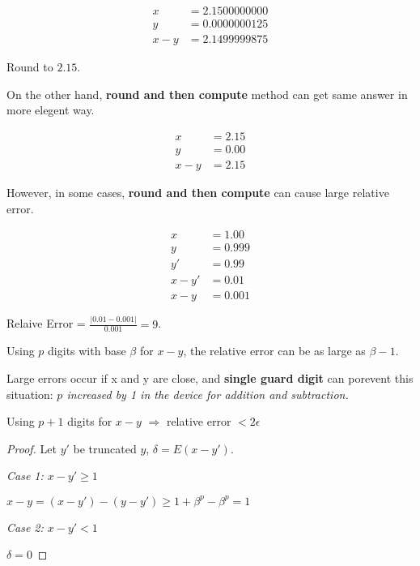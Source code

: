 \begin{align}
    x     &= 2.1500000000 \nonumber \\
    y     &= 0.0000000125 \nonumber \\
    x - y &= 2.1499999875 \nonumber
\end{align}

Round to $2.15$.

On the other hand, \textbf{round and then compute}
method can get same answer in more elegent way.

\begin{align}
    x     &= 2.15 \nonumber \\
    y     &= 0.00 \nonumber \\
    x - y &= 2.15 \nonumber
\end{align}

However, in some cases, \textbf{round and then compute}
can cause large relative error.

\begin{align}
    x      &= 1.00  \nonumber \\
    y      &= 0.999 \nonumber \\
    y'     &= 0.99  \nonumber \\
    x - y' &= 0.01  \nonumber \\
    x - y  &= 0.001 \nonumber
\end{align}

Relaive Error = $\frac{|0.01 - 0.001|}{0.001} = 9$.

\begin{theorem}
    Using $p$ digits with base $\beta$ for $x-y$, the relative error
    can be as large as $\beta - 1$.
\end{theorem}

Large errors occur if x and y are close, and \textbf{single guard digit}
can porevent this situation:
{\it $p$ increased by 1 in the device for addition and subtraction.}


\begin{theorem}
    Using $p+1$ digits for $x-y$ $\Rightarrow$ relative error $ < 2\epsilon$
\end{theorem}

\begin{proof}
    Let $y'$ be truncated $y$, $\delta = E(x - y')$.

    \emph{Case 1: $x - y' \geq 1$}

        $x - y = (x - y') - (y - y') \geq 1 + \beta^p - \beta^p = 1$

    \emph{Case 2: $x - y' < 1$}

        $\delta = 0$

\end{proof}

